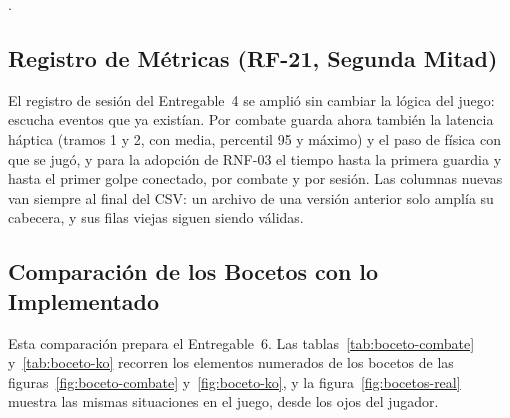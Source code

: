 .

\subsection{Registro de Métricas (RF-21, Segunda Mitad)}
\label{sec:registro5}
El registro de sesión del Entregable~4 se amplió sin cambiar la lógica del juego: escucha eventos que ya existían. Por combate guarda ahora también la latencia háptica (tramos 1 y 2, con media, percentil 95 y máximo) y el paso de física con que se jugó, y para la adopción de RNF-03 el tiempo hasta la primera guardia y hasta el primer golpe conectado, por combate y por sesión. Las columnas nuevas van siempre al final del CSV: un archivo de una versión anterior solo amplía su cabecera, y sus filas viejas siguen siendo válidas.

\subsection{Comparación de los Bocetos con lo Implementado}
\label{sec:bocetos}
Esta comparación prepara el Entregable~6. Las tablas~\ref{tab:boceto-combate} y~\ref{tab:boceto-ko} recorren los elementos numerados de los bocetos de las figuras~\ref{fig:boceto-combate} y~\ref{fig:boceto-ko}, y la figura~\ref{fig:bocetos-real} muestra las mismas situaciones en el juego, desde los ojos del jugador.

\begin{table}[H]
\centering
\caption{Boceto de combate (figura~\ref{fig:boceto-combate}) frente a lo implementado.}
\label{tab:boceto-combate}
\end{table}


